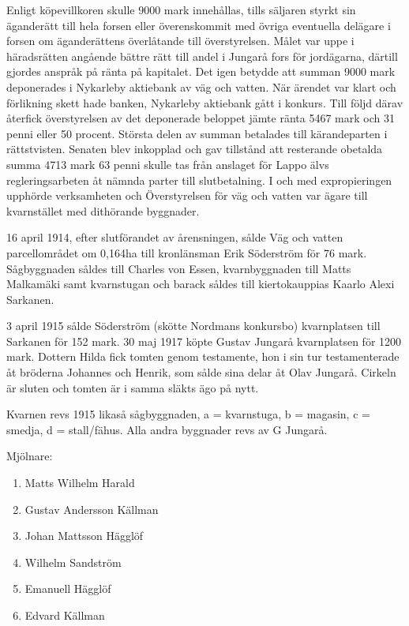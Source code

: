 Enligt köpevillkoren skulle 9000 mark innehållas, tills säljaren styrkt sin äganderätt till hela forsen eller överenskommit med övriga eventuella delägare i forsen om äganderättens överlåtande till överstyrelsen. Målet var uppe i häradsrätten angående bättre rätt till andel i Jungarå fors för jordägarna, därtill gjordes anspråk på ränta på kapitalet. Det igen betydde att summan 9000 mark deponerades i Nykarleby aktiebank av väg och vatten. När ärendet var klart och förlikning skett hade banken, Nykarleby aktiebank gått i konkurs. Till följd därav återfick överstyrelsen av det deponerade beloppet jämte ränta 5467 mark och 31 penni eller 50 procent. Största delen av summan betalades till kärandeparten i rättstvisten. Senaten blev inkopplad och gav tillstånd att resterande obetalda summa 4713 mark 63 penni skulle tas från anslaget för Lappo älvs regleringsarbeten åt nämnda parter till slutbetalning. I och med expropieringen upphörde verksamheten och Överstyrelsen för väg och vatten var ägare till kvarnstället med dithörande byggnader.

16 april 1914, efter slutförandet av årensningen, sålde Väg och vatten parcellområdet om 0,164ha till kronlänsman Erik Söderström för 76 mark. Sågbyggnaden såldes till Charles von Essen, kvarnbyggnaden till Matts Malkamäki samt kvarnstugan och barack såldes till kiertokauppias Kaarlo Alexi Sarkanen.

3 april 1915 sålde Söderström (skötte Nordmans konkursbo) kvarnplatsen till Sarkanen för 152 mark. 30 maj 1917 köpte Gustav Jungarå kvarnplatsen för 1200 mark. Dottern Hilda fick tomten genom testamente, hon i sin tur testamenterade åt bröderna Johannes och Henrik, som sålde sina delar åt Olav Jungarå. Cirkeln är sluten och tomten är i samma släkts ägo på nytt.

Kvarnen revs 1915 likaså sågbyggnaden, a = kvarnstuga, b = magasin, c = smedja, d = stall/fähus. Alla andra byggnader revs av G Jungarå.

Mjölnare:
\begin{enumerate}
  \item Matts Wilhelm Harald
  \item Gustav Andersson Källman
  \item Johan Mattsson Hägglöf
  \item Wilhelm Sandström
  \item Emanuell Hägglöf
  \item Edvard Källman
\end{enumerate}



